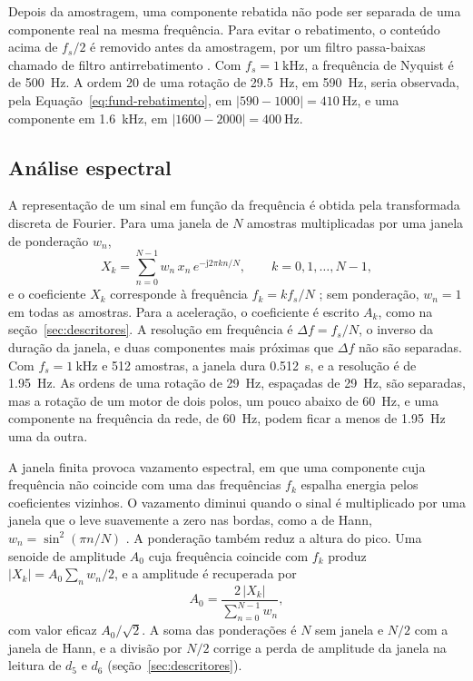 Depois da amostragem, uma componente rebatida não pode ser separada de uma componente real na mesma frequência. Para evitar o rebatimento, o conteúdo acima de $f_s/2$ é removido antes da amostragem, por um filtro passa-baixas chamado de filtro antirrebatimento \cite{brandt2011}. Com $f_s = \SI{1}{\kilo\hertz}$, a frequência de Nyquist é de \SI{500}{\hertz}. A ordem 20 de uma rotação de \SI{29,5}{\hertz}, em \SI{590}{\hertz}, seria observada, pela Equação~\eqref{eq:fund-rebatimento}, em $|590 - 1000| = \SI{410}{\hertz}$, e uma componente em \SI{1,6}{\kilo\hertz}, em $|1600 - 2000| = \SI{400}{\hertz}$.

\subsection{Análise espectral}\label{sec:fund-espectro}

A representação de um sinal em função da frequência é obtida pela transformada discreta de Fourier. Para uma janela de $N$ amostras multiplicadas por uma janela de ponderação $w_n$,
\begin{equation}
X_k = \sum_{n=0}^{N-1} w_n\, x_n\, e^{-\mathrm{j}2\pi k n / N}, \qquad k = 0, 1, \ldots, N-1,
\label{eq:fund-dft}
\end{equation}
e o coeficiente $X_k$ corresponde à frequência $f_k = k f_s/N$ \cite{brandt2011}; sem ponderação, $w_n = 1$ em todas as amostras. Para a aceleração, o coeficiente é escrito $A_k$, como na seção~\ref{sec:descritores}. A resolução em frequência é $\Delta f = f_s/N$, o inverso da duração da janela, e duas componentes mais próximas que $\Delta f$ não são separadas. Com $f_s = \SI{1}{\kilo\hertz}$ e \num{512} amostras, a janela dura \SI{0,512}{\second}, e a resolução é de \SI{1,95}{\hertz}. As ordens de uma rotação de \SI{29}{\hertz}, espaçadas de \SI{29}{\hertz}, são separadas, mas a rotação de um motor de dois polos, um pouco abaixo de \SI{60}{\hertz}, e uma componente na frequência da rede, de \SI{60}{\hertz}, podem ficar a menos de \SI{1,95}{\hertz} uma da outra.

A janela finita provoca vazamento espectral, em que uma componente cuja frequência não coincide com uma das frequências $f_k$ espalha energia pelos coeficientes vizinhos. O vazamento diminui quando o sinal é multiplicado por uma janela que o leve suavemente a zero nas bordas, como a de Hann, $w_n = \sin^2(\pi n/N)$ \cite{brandt2011}. A ponderação também reduz a altura do pico. Uma senoide de amplitude $A_0$ cuja frequência coincide com $f_k$ produz $|X_k| = A_0 \sum_n w_n/2$, e a amplitude é recuperada por
\begin{equation}
A_0 = \frac{2\,|X_k|}{\sum_{n=0}^{N-1} w_n},
\label{eq:fund-amplitude}
\end{equation}
com valor eficaz $A_0/\sqrt{2}$. A soma das ponderações é $N$ sem janela e $N/2$ com a janela de Hann, e a divisão por $N/2$ corrige a perda de amplitude da janela na leitura de $d_5$ e $d_6$ (seção~\ref{sec:descritores}).

